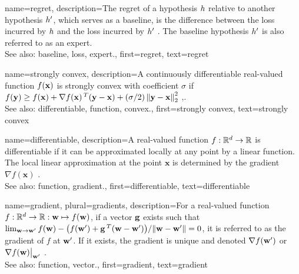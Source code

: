 {name={regret},
	description={The regret of a \gls{hypothesis} $h$ relative to 
		another \gls{hypothesis} $h'$, which serves as a \gls{baseline}, 
		is the difference between the \gls{loss} incurred by $h$ and the \gls{loss} 
		incurred by $h'$ \cite{PredictionLearningGames}. 
		The \gls{baseline} \gls{hypothesis} $h'$ is also referred to as an \gls{expert}.
					\\ 
		See also: \gls{baseline}, \gls{loss}, \gls{expert}.},
	first={regret},
	text={regret} 
}

{name={strongly convex},
	description={A continuously \gls{differentiable} real-valued 
		\gls{function} $f({\bf x})$ is strongly \gls{convex} with coefficient $\sigma$ if $f({\bf y}) \geq f({\bf x}) + \nabla f({\bf x})\,^{T} ({\bf y} - {\bf x}) + (\sigma/2) \left\Vert {{\bf y}- {\bf x}} \right\Vert_{2}^{2}$ \cite{nesterov04},\cite[Sec. B.1.1]{CvxAlgBertsekas}.
					\\ 
		See also: \gls{differentiable}, \gls{function}, \gls{convex}.},
	first={strongly convex},
	text={strongly convex} 
}

{name={differentiable},
	description={A real-valued \gls{function} $f: \mathbb{R}^{d} \rightarrow \mathbb{R}$ 
		is differentiable if it can be approximated locally at any point by a linear \gls{function}. 
		The local linear approximation at the point $\mathbf{x}$ is determined 
		by the \gls{gradient} $\nabla f ( \mathbf{x})$ \cite{RudinBookPrinciplesMatheAnalysis}.
					\\ 
		See also: \gls{function}, \gls{gradient}.},
	first={differentiable},
	text={differentiable} 
}

{name={gradient}, plural={gradients},
	description={For a real-valued \gls{function} 
		$f: \mathbb{R}^{d} \rightarrow \mathbb{R}: {\bf w} \mapsto f({\bf w})$, 
		if a \gls{vector} ${\bf g}$ exists such that 
		$\lim_{{\bf w} \rightarrow {\bf w}'} {f({\bf w}) - \big(f({\bf w}') + {\bf g}\,^{T} ({\bf w} - {\bf w}') \big) }/{\| {\bf w} - {\bf w}'\|}=0$, 
		it is referred to as the gradient of $f$ at ${\bf w}'$. If it exists, the gradient is unique and 
		denoted $\nabla f({\bf w}')$ or $\nabla f({\bf w})\big|_{{\bf w}'}$ \cite{RudinBookPrinciplesMatheAnalysis}.
		\\
		See also: \gls{function}, \gls{vector}.},
	first={gradient},
	text={gradient} 
}

